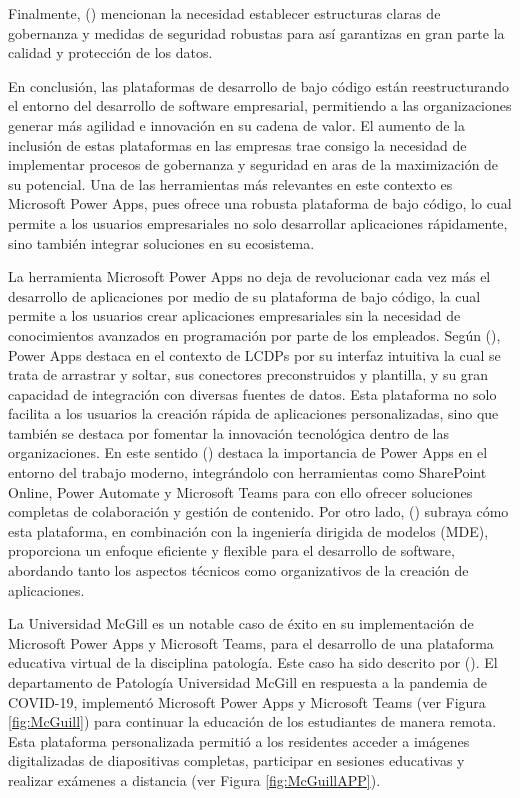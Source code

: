 \documentclass[letter,oneside,12pt,spanish]{report}
\begin{document}
\noindent Finalmente, (\cite{alsaadi2021lcdp}) mencionan la necesidad establecer estructuras claras de gobernanza y medidas de seguridad robustas para así garantizas en gran parte la calidad y protección de los datos.

\noindent En conclusión, las plataformas de desarrollo de bajo código están reestructurando el entorno del desarrollo de software empresarial, permitiendo a las organizaciones generar más agilidad e innovación en su cadena de valor. El aumento de la inclusión de estas plataformas en las empresas trae consigo la necesidad de implementar procesos de gobernanza y seguridad en aras de la maximización de su potencial. Una de las herramientas más relevantes en este contexto es Microsoft Power Apps, pues ofrece una robusta plataforma de bajo código, lo cual permite a los usuarios empresariales no solo desarrollar aplicaciones rápidamente, sino también integrar soluciones en su ecosistema.

\noindent La herramienta Microsoft Power Apps no deja de revolucionar cada vez más el desarrollo de aplicaciones por medio de su plataforma de bajo código, la cual permite a los usuarios crear aplicaciones empresariales sin la necesidad de conocimientos avanzados en programación por parte de los empleados. Según (\cite{pandit2024lcdp}), Power Apps destaca en el contexto de LCDPs por su interfaz intuitiva la cual se trata de arrastrar y soltar, sus conectores preconstruidos y plantilla, y su gran capacidad de integración con diversas fuentes de datos. Esta plataforma no solo facilita a los usuarios la creación rápida de aplicaciones personalizadas, sino que también se destaca por fomentar la innovación tecnológica dentro de las organizaciones. En este sentido (\cite{narayn2023modernworkplace}) destaca la importancia de Power Apps en el entorno del trabajo moderno, integrándolo con herramientas como SharePoint Online, Power Automate y Microsoft Teams para con ello ofrecer soluciones completas de colaboración y gestión de contenido. Por otro lado, (\cite{diRuscio2022lcdp}) subraya cómo esta plataforma, en combinación con la ingeniería dirigida de modelos (MDE), proporciona un enfoque eficiente y flexible para el desarrollo de software, abordando tanto los aspectos técnicos como organizativos de la creación de aplicaciones.

\noindent La Universidad McGill es un notable caso de éxito en su implementación de Microsoft Power Apps y Microsoft Teams, para el desarrollo de una plataforma educativa virtual de la disciplina patología. Este caso ha sido descrito por (\cite{rajaram2022pathology}). El departamento de Patología Universidad McGill en respuesta a la pandemia de COVID-19, implementó Microsoft Power Apps y Microsoft Teams (ver Figura \ref{fig:McGuill}) para continuar la educación de los estudiantes de manera remota. Esta plataforma personalizada permitió a los residentes acceder a imágenes digitalizadas de diapositivas completas, participar en sesiones educativas y realizar exámenes a distancia (ver Figura \ref{fig:McGuillAPP}).
\end{document}
